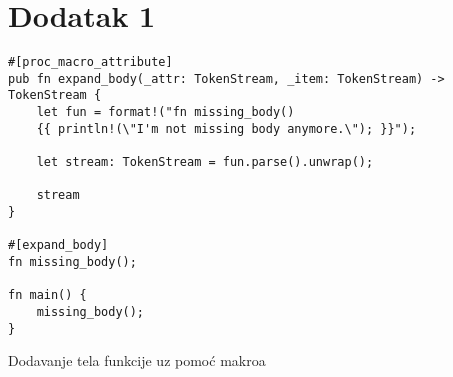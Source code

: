 \section{Dodatak 1}

\begin{listing}[H]
\begin{verbatim}
#[proc_macro_attribute]
pub fn expand_body(_attr: TokenStream, _item: TokenStream) -> TokenStream {
    let fun = format!("fn missing_body() 
    {{ println!(\"I'm not missing body anymore.\"); }}");

    let stream: TokenStream = fun.parse().unwrap();

    stream
}

#[expand_body]
fn missing_body();

fn main() {
    missing_body();
}
\end{verbatim}
\caption{Dodavanje tela funkcije uz pomoć makroa}
\label{lst:bonus_body_expand}
\end{listing}



